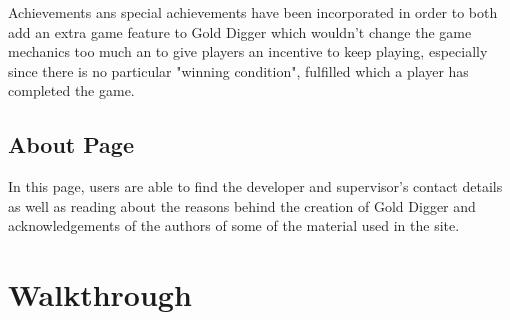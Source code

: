 \documentclass{mproj}
\begin{document}
Achievements ans special achievements have been incorporated in order to both add an extra game feature to Gold Digger which wouldn't change the game mechanics too much an to give players an incentive to keep playing, especially since there is no particular "winning condition", fulfilled which a player has completed the game.  

\subsection{About Page}

In this page, users are able to find  the developer and supervisor's contact details as well as reading about the reasons behind the creation of Gold Digger and acknowledgements of the authors of some of the material used in the site.


\section{Walkthrough}
\end{document}
